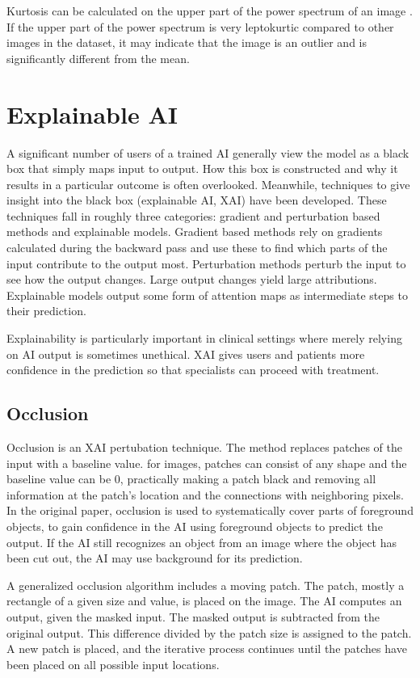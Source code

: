 Kurtosis can be calculated on the upper part of the power spectrum of an image .
If the upper part of the power spectrum is very leptokurtic compared to other images in the dataset, it may indicate that the image is an outlier and is significantly different from the mean.

\section{Explainable AI}
A significant number of users of a trained AI generally view the model as a black box that simply maps input to output.
How this box is constructed and why it results in a particular outcome is often overlooked.
Meanwhile, techniques to give insight into the black box (explainable AI, XAI) have been developed.
These techniques fall in roughly three categories: gradient and perturbation based methods and explainable models.
Gradient based methods rely on gradients calculated during the backward pass and use these to find which parts of the input contribute to the output most.
Perturbation methods perturb the input to see how the output changes.
Large output changes yield large attributions.
Explainable models output some form of attention maps as intermediate steps to their prediction.

Explainability is particularly important in clinical settings where merely relying on AI output is sometimes unethical.
XAI gives users and patients more confidence in the prediction so that specialists can proceed with treatment.

\subsection{Occlusion}\label{subsec:occlusion}
Occlusion  is an XAI pertubation technique.
The method replaces patches of the input with a baseline value.
\eg for images, patches can consist of any shape and the baseline value can be 0, practically making a patch black and removing all information at the patch's location and the connections with neighboring pixels.
In the original paper, occlusion is used to systematically cover parts of foreground objects, to gain confidence in the AI using foreground objects to predict the output.
If the AI still recognizes an object from an image where the object has been cut out, the AI may use background for its prediction.

A generalized occlusion algorithm includes a moving patch.
The patch, mostly a rectangle of a given size and value, is placed on the image.
The AI computes an output, given the masked input.
The masked output is subtracted from the original output.
This difference divided by the patch size is assigned to the patch.
A new patch is placed, and the iterative process continues until the patches have been placed on all possible input locations.

